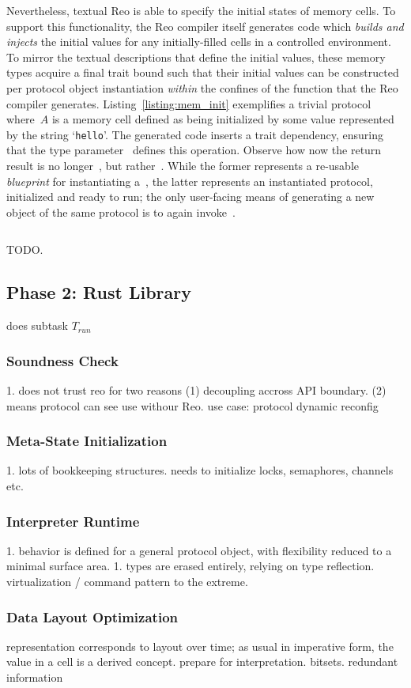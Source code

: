Nevertheless, textual Reo is able to specify the initial states of memory cells. To support this functionality, the Reo compiler itself generates code which \textit{builds and injects} the initial values for any initially-filled cells in a controlled environment. To mirror the textual descriptions that define the initial values, these memory types acquire a final trait bound such that their initial values can be constructed per protocol object instantiation \textit{within} the confines of the function that the Reo compiler generates. Listing~\ref{listing:mem_init} exemplifies a trivial protocol where~$A$ is a memory cell defined as being initialized by some value represented by the string `\texttt{hello}'. The generated code inserts a trait dependency, ensuring that the type parameter~ defines this operation. Observe how now the return result is no longer~, but rather~. While the former represents a re-usable \textit{blueprint} for instantiating a~, the latter represents an instantiated protocol, initialized and ready to run; the only user-facing means of generating a new object of the same protocol is to again invoke~.

\begin{listing}[ht]
	\centering
	\inputminted[]{rust}{mem_init.rs}
	\caption[TODO.]{TODO.}
	\label{listing:mem_init}
\end{listing}


\subsection{Phase 2: Rust Library}
\label{sec:translation_phase_2}
does subtask $T_{run}$

\subsubsection{Soundness Check}
1. does not trust reo for two reasons (1) decoupling accross API boundary. (2) means protocol can see use withour Reo. use case: protocol dynamic reconfig

\subsubsection{Meta-State Initialization}
1. lots of bookkeeping structures. needs to initialize locks, semaphores, channels etc.


\subsubsection{Interpreter Runtime}
1. behavior is defined for a general protocol object, with flexibility reduced to a minimal surface area. 
1. types are erased entirely, relying on type reflection. virtualization / command pattern to the extreme.

\subsubsection{Data Layout Optimization}
representation corresponds to layout over time; as usual in imperative form, the value in a cell is a derived concept. prepare for interpretation. bitsets. redundant information


